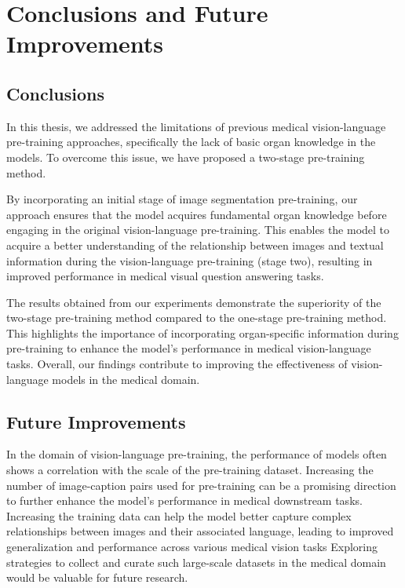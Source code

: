 \chapter{Conclusions and Future Improvements}
\label{chapter:ch5}

\section{Conclusions}

In this thesis, we addressed the limitations of previous medical vision-language pre-training approaches, specifically the lack of basic organ knowledge in the models. To overcome this issue, we have proposed a two-stage pre-training method.

By incorporating an initial stage of image segmentation pre-training, our approach ensures that the model acquires fundamental organ knowledge before engaging in the original vision-language pre-training. This enables the model to acquire a better understanding of the relationship between images and textual information during the vision-language pre-training (stage two), resulting in improved performance in medical visual question answering tasks.

The results obtained from our experiments demonstrate the superiority of the two-stage pre-training method compared to the one-stage pre-training method. This highlights the importance of incorporating organ-specific information during pre-training to enhance the model's performance in medical vision-language tasks. Overall, our findings contribute to improving the effectiveness of vision-language models in the medical domain.

\section{Future Improvements}
In the domain of vision-language pre-training, the performance of models often shows a correlation with the scale of the pre-training dataset. Increasing the number of image-caption pairs used for pre-training can be a promising direction to further enhance the model's performance in medical downstream tasks. Increasing the training data can help the model better capture complex relationships between images and their associated language, leading to improved generalization and performance across various medical vision tasks Exploring strategies to collect and curate such large-scale datasets in the medical domain would be valuable for future research.


